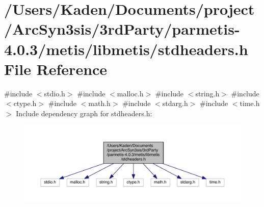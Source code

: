 \hypertarget{a00284}{}\section{/\+Users/\+Kaden/\+Documents/project/\+Arc\+Syn3sis/3rd\+Party/parmetis-\/4.0.3/metis/libmetis/stdheaders.h File Reference}
\label{a00284}
{\ttfamily \#include $<$stdio.\+h$>$}\newline
{\ttfamily \#include $<$malloc.\+h$>$}\newline
{\ttfamily \#include $<$string.\+h$>$}\newline
{\ttfamily \#include $<$ctype.\+h$>$}\newline
{\ttfamily \#include $<$math.\+h$>$}\newline
{\ttfamily \#include $<$stdarg.\+h$>$}\newline
{\ttfamily \#include $<$time.\+h$>$}\newline
Include dependency graph for stdheaders.\+h\+:\nopagebreak
\begin{figure}[H]
\begin{center}
\leavevmode
\includegraphics[width=350pt]{a00285}
\end{center}
\end{figure}
